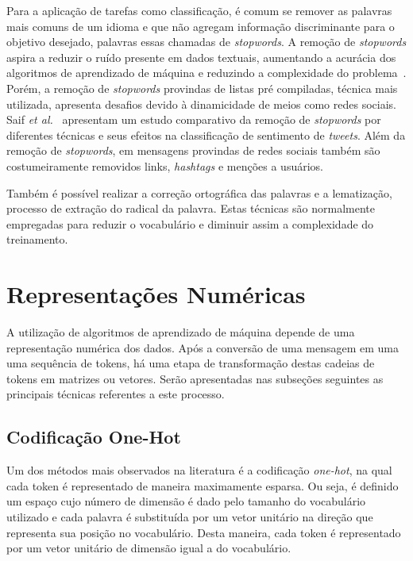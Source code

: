Para a aplicação de tarefas como classificação, é comum se remover as palavras mais comuns de um idioma e que não
agregam informação discriminante para o objetivo desejado, palavras essas chamadas de \textit{stopwords}.
A remoção de \textit{stopwords} aspira a reduzir o ruído presente em dados textuais, aumentando a acurácia dos
algoritmos de aprendizado de máquina e reduzindo a complexidade do problema~\cite{silva03}.
Porém, a remoção de \textit{stopwords} provindas de listas pré compiladas, técnica mais utilizada, apresenta desafios
devido à dinamicidade de meios como redes sociais.
Saif \textit{et al.}~\cite{saif14} apresentam um estudo comparativo da remoção de \textit{stopwords} por diferentes
técnicas e seus efeitos na classificação de sentimento de \textit{tweets}.
Além da remoção de \textit{stopwords}, em mensagens provindas de redes sociais também são costumeiramente removidos
links, \textit{hashtags} e menções a usuários.

Também é possível realizar a correção ortográfica das palavras e a lematização, processo de extração do radical da
palavra.
Estas técnicas são normalmente empregadas para reduzir o vocabulário e diminuir assim a complexidade do treinamento.

\section{Representações Numéricas}

A utilização de algoritmos de aprendizado de máquina depende de uma representação numérica dos dados.
Após a conversão de uma mensagem em uma uma sequência de tokens, há uma etapa de transformação destas cadeias
de tokens em matrizes ou vetores.
Serão apresentadas nas subseções seguintes as principais técnicas referentes a este processo.

\subsection{Codificação One-Hot}

Um dos métodos mais observados na literatura é a codificação \textit{one-hot}, na qual cada token é representado de
maneira maximamente esparsa.
Ou seja, é definido um espaço cujo número de dimensão é dado pelo tamanho do vocabulário utilizado e cada palavra é
substituída por um vetor unitário na direção que representa sua posição no vocabulário.
Desta maneira, cada token é representado por um vetor unitário de dimensão igual a do vocabulário.

